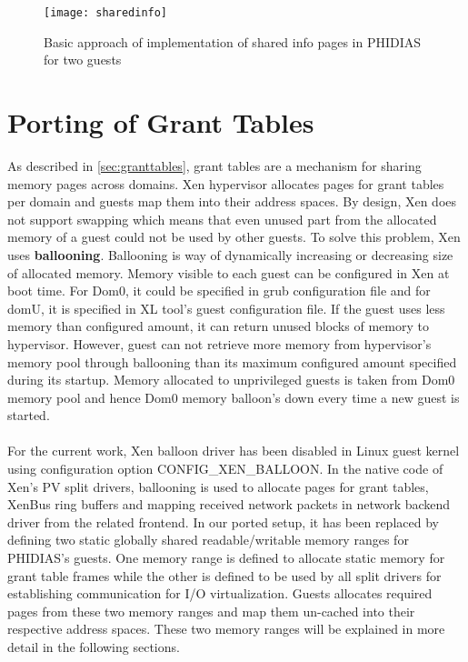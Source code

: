 \begin{figure}[!htbp]
	\centering
	\texttt{[image: sharedinfo]}
	\caption{Basic approach of implementation of shared info pages in PHIDIAS for two guests}
	\label{sharedinfo}
\end{figure}


\section{Porting of Grant Tables\label{sec:granttablesstatic}}
As described in \ref{sec:granttables}, grant tables are a mechanism for sharing memory pages across domains. Xen hypervisor allocates pages for grant tables per domain and guests map them into their address spaces. By design, Xen does not support swapping which means that even unused part from the allocated memory of a guest could not be used by other guests. To solve this problem, Xen uses \textbf{ballooning}. Ballooning is way of dynamically increasing or decreasing size of allocated memory. Memory visible to each guest can be configured in Xen at boot time. For Dom0, it could be specified in grub configuration file and for domU, it is specified in XL tool's guest configuration file. If the guest uses less memory than configured amount, it can return unused blocks of memory to hypervisor. However, guest can not retrieve more memory from hypervisor's memory pool through ballooning than its maximum configured amount specified during its startup. Memory allocated to unprivileged guests is taken from Dom0 memory pool and hence Dom0 memory balloon's down every time a new guest is started.
\\
\\
For the current work, Xen balloon driver has been disabled in Linux guest kernel using configuration option CONFIG\_XEN\_BALLOON. In the native code of Xen's PV split drivers, ballooning is used to allocate pages for grant tables, XenBus ring buffers and mapping received network packets in network backend driver from the related frontend. In our ported setup, it has been replaced by defining two static globally shared readable/writable memory ranges for PHIDIAS's guests. One memory range is defined to allocate static memory for grant table frames while the other is defined to be used by all split drivers for establishing communication for I/O virtualization. Guests allocates required pages from these two memory ranges and map them un-cached into their respective address spaces. These two memory ranges will be explained in more detail in the following sections.

